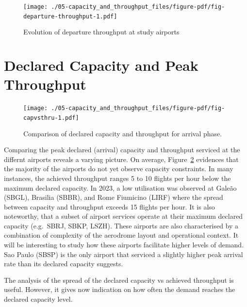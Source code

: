 \documentclass[
  a4paper,
  DIV=11,
  numbers=noendperiod]{scrreport}
\begin{document}
\begin{figure}[H]

{\centering \texttt{[image: ./05-capacity\_and\_throughput\_files/figure-pdf/fig-departure-throughput-1.pdf]}

}

\caption{\label{fig-departure-throughput}Evolution of departure
throughput at study airports}

\end{figure}

\hypertarget{declared-capacity-and-peak-throughput}{%
\section{Declared Capacity and Peak
Throughput}\label{declared-capacity-and-peak-throughput}}

\begin{figure}[H]

{\centering \texttt{[image: ./05-capacity\_and\_throughput\_files/figure-pdf/fig-capvsthru-1.pdf]}

}

\caption{\label{fig-capvsthru}Comparison of declared capacity and
throughput for arrival phase.}

\end{figure}

Comparing the peak declared (arrival) capacity and throughput serviced
at the differnt airports reveals a varying picture. On average,
Figure~\ref{fig-capvsthru} evidences that the majority of the airports
do not yet observe capacity constraints. In many instances, the achieved
throughput ranges 5 to 10 flights per hour below the maximum declared
capacity. In 2023, a low utilisation was observed at Galeão (SBGL),
Brasilia (SBBR), and Rome Fiumicino (LIRF) where the spread between
capacity and throughput exceeds 15 flights per hour. It is also
noteworthy, that a subset of airport services operate at their maximum
declared capacity (e.g.~SBRJ, SBKP, LSZH). These airports are also
characterised by a combination of complexity of the aerodrome layout and
operational context. It will be interesting to study how these airports
facilitate higher levels of demand. Sao Paulo (SBSP) is the only airport
that serviced a slightly higher peak arrival rate than its declared
capacity suggests.

The analysis of the spread of the declared capacity vs achieved
throughput is useful. However, it gives now indication on how often the
demand reaches the declared capacity level.
\end{document}
